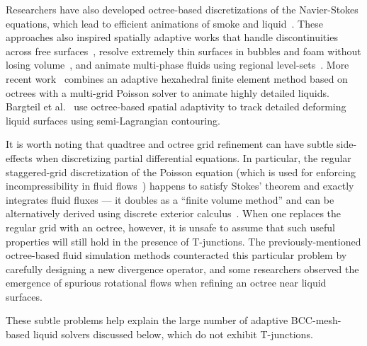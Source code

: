 Researchers have also developed octree-based discretizations of the Navier-Stokes equations, which lead to efficient animations of smoke and liquid~\cite{Shi2004,Losasso2004,Losasso2005}.
These approaches also inspired spatially adaptive works that handle discontinuities across free surfaces~\cite{Hong2005}, resolve extremely thin surfaces in bubbles and foam without losing volume~\cite{Kim2007}, and animate multi-phase fluids using regional level-sets~\cite{Kim2010MultiPhase}. More recent work~\cite{Ferstl2014} combines an adaptive hexahedral finite element method based on octrees with a multi-grid Poisson solver to animate highly detailed liquids. Bargteil et al.~\cite{Bargteil2006} use octree-based spatial adaptivity to track detailed deforming liquid surfaces using semi-Lagrangian contouring.

It is worth noting that quadtree and octree grid refinement can have subtle side-effects when discretizing partial differential equations. In particular, the regular staggered-grid discretization of the Poisson equation (which is used for enforcing incompressibility in fluid flows~\cite{Bridson2008}) happens to satisfy Stokes' theorem and exactly integrates fluid fluxes --- it doubles as a ``finite volume method'' and can be alternatively derived using discrete exterior calculus~\cite{Crane:2013:DGP}. When one replaces the regular grid with an octree, however, it is unsafe to assume that such useful properties will still hold in the presence of T-junctions. The previously-mentioned octree-based fluid simulation methods counteracted this particular problem by carefully designing a new divergence operator, and some researchers observed the emergence of spurious rotational flows when refining an octree near liquid surfaces. 

These subtle problems help explain the large number of adaptive BCC-mesh-based liquid solvers discussed below, which do not exhibit T-junctions.

